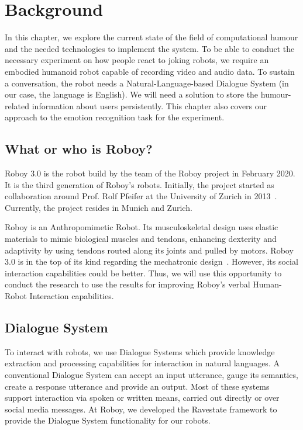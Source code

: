 
\chapter{Background}\label{chapter:background}

In this chapter, we explore the current state of the field of computational humour and the needed technologies to implement the system. To be able to conduct the necessary experiment on how people react to joking robots, we require an embodied humanoid robot capable of recording video and audio data. To sustain a conversation, the robot needs a Natural-Language-based Dialogue System (in our case, the language is English). We will need a solution to store the humour-related information about users persistently. This chapter also covers our approach to the emotion recognition task for the experiment. \par

\section{What or who is Roboy?}
Roboy 3.0 is the robot build by the team of the Roboy project in February 2020. It is the third generation of Roboy’s robots. Initially, the project started as collaboration around Prof. Rolf Pfeifer at the University of Zurich in 2013~\parencite{IJCAI136900}. Currently, the project resides in Munich and Zurich.

Roboy is an Anthropomimetic Robot. Its musculoskeletal design uses elastic materials to mimic biological muscles and tendons, enhancing dexterity and adaptivity by using tendons routed along its joints and pulled by motors. Roboy 3.0 is in the top of its kind regarding the mechatronic design~\parencite{cardsflow}. However, its social interaction capabilities could be better. Thus, we will use this opportunity to conduct the research to use the results for improving Roboy’s verbal Human-Robot Interaction capabilities.
    
\section{Dialogue System}\label{section:dialogues}
To interact with robots, we use Dialogue Systems which provide knowledge extraction and processing capabilities for interaction in natural languages. A conventional Dialogue System can accept an input utterance, gauge its semantics, create a response utterance and provide an output. Most of these systems support interaction via spoken or written means, carried out directly or over social media messages. At Roboy, we developed the Ravestate framework to provide the Dialogue System functionality for our robots.

